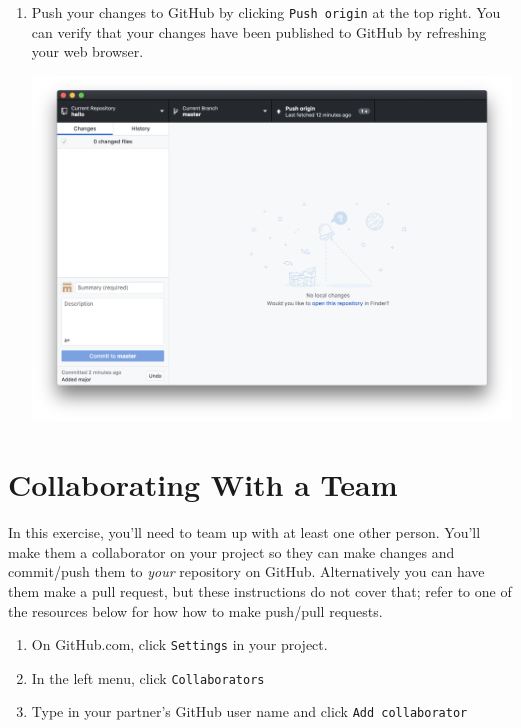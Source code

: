 \documentclass[12pt]{scrartcl}
\begin{document}
\begin{enumerate}
  \item Push your changes to GitHub by clicking \texttt{Push origin}
  at the top right.  You can verify that your changes have been published
  to GitHub by refreshing your web browser.
  \begin{center}
  \includegraphics[scale=0.125]{./hack1.0-files/pushChange.png}
  \end{center}

\end{enumerate}

\section{Collaborating With a Team}

In this exercise, you'll need to team up with at least one other person.
You'll make them a collaborator on your project so they can make changes
and commit/push them to \emph{your} repository on GitHub.  Alternatively
you can have them make a pull request, but these instructions do not cover 
that; refer to one of the resources below for how how to make push/pull
requests.

\begin{enumerate}
  \item On GitHub.com, click \texttt{Settings} in your project.
  \item In the left menu, click \texttt{Collaborators}
  \item Type in your partner's GitHub user name and click \texttt{Add collaborator}
\end{enumerate}
\end{document}
